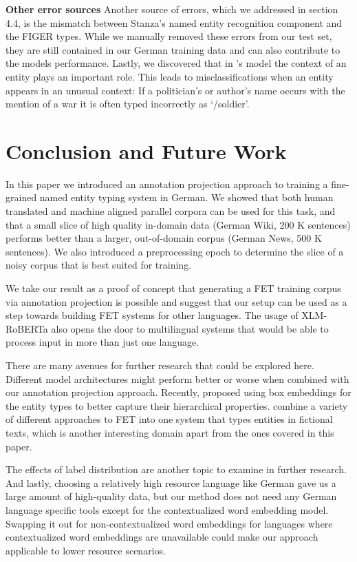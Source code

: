 \documentclass[11pt,a4paper]{article}
\begin{document}
\textbf{Other error sources} Another source of errors, which we addressed in section 4.4, is the mismatch between Stanza's named entity recognition component and the FIGER types. While we manually removed these errors from our test set, they are still contained in our German training data and can also contribute to the models performance. Lastly, we discovered that in \cite{ChenCD20}'s model the context of an entity plays an important role. This leads to misclassifications when an entity appears in an unusual context: If a politician's or author's name occurs with the mention of a war it is often typed incorrectly as `/soldier'.

\section{Conclusion and Future Work}
In this paper we introduced an annotation projection approach to training a fine-grained named entity typing system in German. We showed that both human translated and machine aligned parallel corpora can be used for this task, and that a small slice of high quality in-domain data (German Wiki, 200 K sentences) performs better than a larger, out-of-domain corpus (German News, 500 K sentences). We also introduced a preprocessing epoch to determine the slice of a noisy corpus that is best suited for training.

We take our result as a proof of concept that generating a FET training corpus via annotation projection is possible and suggest that our setup can be used as a step towards building FET systems for other languages. The usage of XLM-RoBERTa also opens the door to multilingual systems that would be able to process input in more than just one language. 

There are many avenues for further research that could be explored here. Different model architectures might perform better or worse when combined with our annotation projection approach. Recently, \citet{onoe2021modeling} proposed using box embeddings for the entity types to better capture their hierarchical properties. \citet{chu-etal-2020-entyfi} combine a variety of different approaches to FET into one system that types entities in fictional texts, which is another interesting domain apart from the ones covered in this paper. 

The effects of label distribution are another topic to examine in further research. And lastly, choosing a relatively high resource language like German gave us a large amount of high-quality data, but our method does not need any German language specific tools except for the contextualized word embedding model. Swapping it out for non-contextualized word embeddings for languages where contextualized word embeddings are unavailable could make our approach applicable to lower resource scenarios.  





\end{document}
